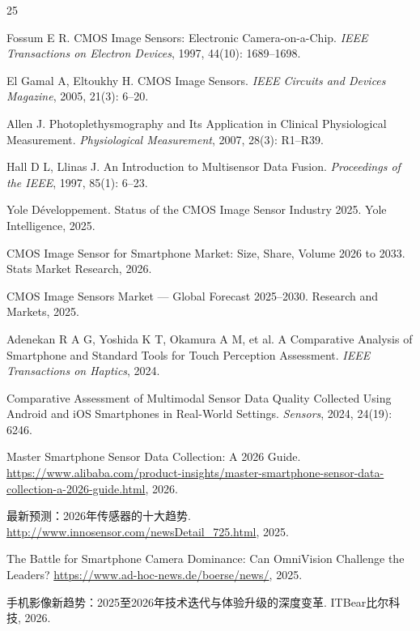 \documentclass[12pt, a4paper]{ctexart}
\begin{document}
\begin{thebibliography}{25}

    Fossum E R.
    CMOS Image Sensors: Electronic Camera-on-a-Chip.
    \textit{IEEE Transactions on Electron Devices}, 1997, 44(10): 1689--1698.

    El Gamal A, Eltoukhy H.
    CMOS Image Sensors.
    \textit{IEEE Circuits and Devices Magazine}, 2005, 21(3): 6--20.

    Allen J.
    Photoplethysmography and Its Application in Clinical Physiological Measurement.
    \textit{Physiological Measurement}, 2007, 28(3): R1--R39.

    Hall D L, Llinas J.
    An Introduction to Multisensor Data Fusion.
    \textit{Proceedings of the IEEE}, 1997, 85(1): 6--23.

    Yole Développement.
    Status of the CMOS Image Sensor Industry 2025.
    Yole Intelligence, 2025.

    CMOS Image Sensor for Smartphone Market: Size, Share, Volume 2026 to 2033.
    Stats Market Research, 2026.

    CMOS Image Sensors Market --- Global Forecast 2025--2030.
    Research and Markets, 2025.

    Adenekan R A G, Yoshida K T, Okamura A M, et al.
    A Comparative Analysis of Smartphone and Standard Tools for Touch Perception Assessment.
    \textit{IEEE Transactions on Haptics}, 2024.

    Comparative Assessment of Multimodal Sensor Data Quality Collected Using Android and iOS Smartphones in Real-World Settings.
    \textit{Sensors}, 2024, 24(19): 6246.

    Master Smartphone Sensor Data Collection: A 2026 Guide.
    \url{https://www.alibaba.com/product-insights/master-smartphone-sensor-data-collection-a-2026-guide.html}, 2026.

    最新预测：2026年传感器的十大趋势.
    \url{http://www.innosensor.com/newsDetail_725.html}, 2025.

    The Battle for Smartphone Camera Dominance: Can OmniVision Challenge the Leaders?
    \url{https://www.ad-hoc-news.de/boerse/news/}, 2025.

    手机影像新趋势：2025至2026年技术迭代与体验升级的深度变革.
    ITBear比尔科技, 2026.


\end{thebibliography}
\end{document}
